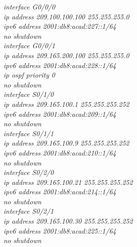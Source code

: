 \documentclass[12pt,a4paper]{report}
\begin{document}
\hspace*{2cm}\textit{interface G0/0/0\\
\hspace*{2cm}ip address 209.100.100.100 255.255.255.0\\
\hspace*{2cm}ipv6 address 2001:db8:acad:227::1/64\\
\hspace*{2cm}no shutdown\\
\hspace*{2cm}interface G0/0/1\\
\hspace*{2cm}ip address 209.165.200.100 255.255.255.0\\
\hspace*{2cm}ipv6 address 2001:db8:acad:228::1/64\\
\hspace*{2cm}ip ospf priority 0\\
\hspace*{2cm}no shutdown\\
\hspace*{2cm}interface S0/1/0\\
\hspace*{2cm}ip address 209.165.100.1 255.255.255.252\\
\hspace*{2cm}ipv6 address 2001:db8:acad:209::1/64\\
\hspace*{2cm}no shutdown\\
\hspace*{2cm}interface S0/1/1\\
\hspace*{2cm}ip address 209.165.100.9 255.255.255.252\\
\hspace*{2cm}ipv6 address 2001:db8:acad:210::1/64\\
\hspace*{2cm}no shutdown\\
\hspace*{2cm}interface S0/2/0\\
\hspace*{2cm}ip address 209.165.100.21 255.255.255.252\\
\hspace*{2cm}ipv6 address 2001:db8:acad:214::1/64\\
\hspace*{2cm}no shutdown\\
\hspace*{2cm}interface S0/2/1\\
\hspace*{2cm}ip address 209.165.100.30 255.255.255.252\\
\hspace*{2cm}ipv6 address 2001:db8:acad:225::1/64\\
\hspace*{2cm}no shutdown\\}
\end{document}
